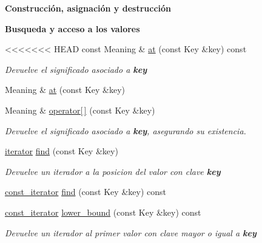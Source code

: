 \begin{Indent}{\bf \-Construcción, asignación y destrucción}
\begin{Indent}\textbf{ Busqueda y acceso a los valores}\par
\begin{DoxyCompactItemize}
\item 
<<<<<<< HEAD
const \-Meaning \& \hyperlink{classaed2_1_1iterator_a8cca919f59850908ef421db454db835a_a8cca919f59850908ef421db454db835a}{at} (const \-Key \&key) const 
\begin{DoxyCompactList}\small\item\em \-Devuelve el significado asociado a {\bfseries key} \end{DoxyCompactList}\item 
\-Meaning \& \hyperlink{classaed2_1_1iterator_ac0459c685868fba041b9be2cde974119_ac0459c685868fba041b9be2cde974119}{at} (const \-Key \&key)
\item 
\-Meaning \& \hyperlink{classaed2_1_1iterator_af74d214f3278d8cd6b3a5a721e173fa3_af74d214f3278d8cd6b3a5a721e173fa3}{operator\mbox{[}$\,$\mbox{]}} (const \-Key \&key)
\begin{DoxyCompactList}\small\item\em \-Devuelve el significado asociado a {\bfseries key}, asegurando su existencia. \end{DoxyCompactList}\item 
\hyperlink{classaed2_1_1iterator_1_1iterator}{iterator} \hyperlink{classaed2_1_1iterator_a3d87256cbfc935a932677092ec57f49a_a3d87256cbfc935a932677092ec57f49a}{find} (const \-Key \&key)
\begin{DoxyCompactList}\small\item\em \-Devuelve un iterador a la posicion del valor con clave {\bfseries key} \end{DoxyCompactList}\item 
\hyperlink{classaed2_1_1iterator_1_1const__iterator}{const\-\_\-iterator} \hyperlink{classaed2_1_1iterator_aebe4bb3359d2223a83a0afe5f92e0c84_aebe4bb3359d2223a83a0afe5f92e0c84}{find} (const \-Key \&key) const 
\item 
\hyperlink{classaed2_1_1iterator_1_1const__iterator}{const\-\_\-iterator} \hyperlink{classaed2_1_1iterator_afbdd3bc5a5dc3565f3c743d6d5e82d73_afbdd3bc5a5dc3565f3c743d6d5e82d73}{lower\-\_\-bound} (const \-Key \&key) const 
\begin{DoxyCompactList}\small\item\em \-Devuelve un iterador al primer valor con clave mayor o igual a {\bfseries key} \end{DoxyCompactList}\item 

\end{DoxyCompactItemize}
\end{Indent}
\end{Indent}
